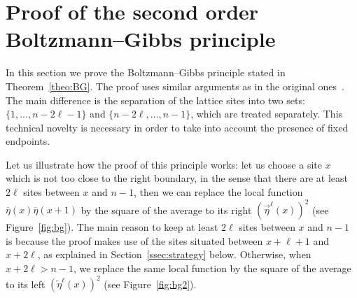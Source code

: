 \documentclass[AHL,Unicode,longabstracts]{cedram}
\renewcommand\vec[1]{\overrightarrow{#1}}
\newcommand\vecleft[1]{\overleftarrow{#1}}
\renewcommand{\bar}{\overline}
\begin{document}
\section{Proof of the second order Boltzmann--Gibbs principle}\label{sec:proofBG}
\label{s5}

In this section we prove the Boltzmann--Gibbs principle stated in Theorem~\ref{theo:BG}. The proof uses similar arguments as in the original ones~\cite{GJSi,blondel2016,fgsimon2015}. The main difference is the separation of the lattice sites into two sets: $\{1,\dots,n-2\ell-1\}$ and $\{n-2\ell,\dots,n-1\}$, which are treated separately. This technical novelty is necessary in order to take into account the presence of fixed endpoints.

Let us illustrate how the proof of this principle works: let us choose a site $x$ which is not too close to the right boundary, in the sense that there are at least $2\ell$ sites between $x$ and $n-1$, then we can replace the local function $\bar\eta(x)\bar\eta(x+1)$ by the square of the average to its right $(\vec\eta^\ell(x))^2$ (see Figure~\ref{fig:bg}). The main reason to keep at least $2\ell$ sites between $x$ and $n-1$ is because the proof makes use of the sites situated between $x+\ell+1$ and $x+2\ell$, as explained in Section~\ref{ssec:strategy} below. Otherwise, when $x+2\ell > n-1$, we replace the same local function by the square of the average to its left $(\vecleft\eta^\ell(x))^2$ (see Figure~\ref{fig:bg2}).
\end{document}
